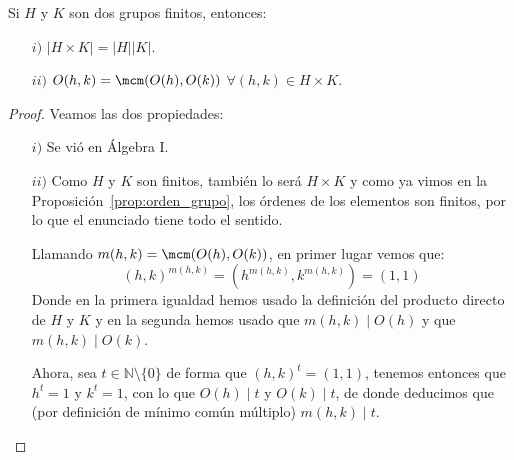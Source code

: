 \begin{prop}
    Si $H$ y $K$ son dos grupos finitos, entonces:
    \begin{enumerate}
        \item[$i)$] $|H\times K| = |H||K|$.
        \item[$ii)$] $O(h,k) = \mcm(O(h), O(k))$ $\forall (h,k)\in H\times K$.
    \end{enumerate}
    \begin{proof}
        Veamos las dos propiedades:
        \begin{enumerate}
            \item[$i)$] Se vió en Álgebra I.
            \item[$ii)$] Como $H$ y $K$ son finitos, también lo será $H\times K$ y como ya vimos en la Proposición~\ref{prop:orden_grupo}, los órdenes de los elementos son finitos, por lo que el enunciado tiene todo el sentido.

                Llamando $m(h,k) = \mcm(O(h),O(k))$, en primer lugar vemos que:
                \begin{equation*}
                    {(h,k)}^{m(h,k)} = \left(h^{m(h,k)},k^{m(h,k)}\right) = (1,1)
                \end{equation*}
                Donde en la primera igualdad hemos usado la definición del producto directo de $H$ y $K$ y en la segunda hemos usado que $m(h,k)\mid O(h)$ y que $m(h,k)\mid O(k)$.

                Ahora, sea $t\in \mathbb{N}\setminus\{0\}$ de forma que ${(h,k)}^{t} = (1,1)$, tenemos entonces que $h^t = 1$ y $k^t = 1$, con lo que $O(h) \mid t$ y $O(k)\mid t$, de donde deducimos que (por definición de mínimo común múltiplo) $m(h,k)\mid t$. \qedhere
        \end{enumerate} 
    \end{proof}
\end{prop}

